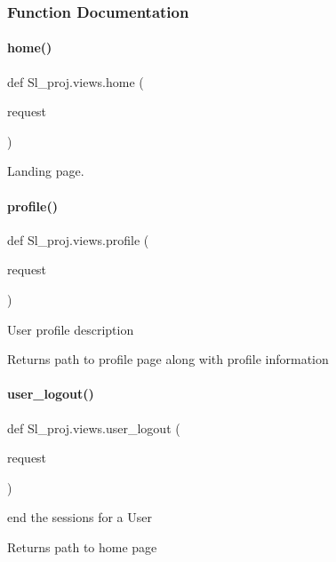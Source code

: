 \subsubsection{Function Documentation}
\mbox{\label{namespaceSl__proj_1_1views_a928e14d2a7b62a8982047413e5fbd2aa}} 
\paragraph{\texorpdfstring{home()}{home()}}
{\footnotesize\ttfamily def Sl\+\_\+proj.\+views.\+home (\begin{DoxyParamCaption}\item[{}]{request }\end{DoxyParamCaption})}



Landing page. 

\mbox{\label{namespaceSl__proj_1_1views_ae1cce36a8cea71405a15f47f0e491175}} 
\paragraph{\texorpdfstring{profile()}{profile()}}
{\footnotesize\ttfamily def Sl\+\_\+proj.\+views.\+profile (\begin{DoxyParamCaption}\item[{}]{request }\end{DoxyParamCaption})}



User profile description 

\begin{DoxyReturn}{Returns}
path to profile page along with profile information 
\end{DoxyReturn}
\mbox{\label{namespaceSl__proj_1_1views_ab38d32930366933823e87edb2d6d62e8}} 
\paragraph{\texorpdfstring{user\+\_\+logout()}{user\_logout()}}
{\footnotesize\ttfamily def Sl\+\_\+proj.\+views.\+user\+\_\+logout (\begin{DoxyParamCaption}\item[{}]{request }\end{DoxyParamCaption})}



end the sessions for a User 

\begin{DoxyReturn}{Returns}
path to home page 
\end{DoxyReturn}
